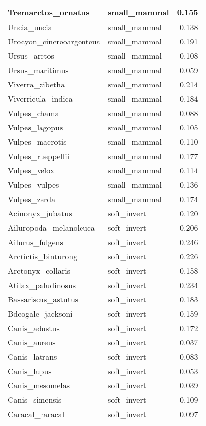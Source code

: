 \begin{table}
\begin{tabular}[t]{l|l|r}
\hline
Tremarctos\_ornatus & small\_mammal & 0.155\\
\hline
Uncia\_uncia & small\_mammal & 0.138\\
\hline
Urocyon\_cinereoargenteus & small\_mammal & 0.191\\
\hline
Ursus\_arctos & small\_mammal & 0.108\\
\hline
Ursus\_maritimus & small\_mammal & 0.059\\
\hline
Viverra\_zibetha & small\_mammal & 0.214\\
\hline
Viverricula\_indica & small\_mammal & 0.184\\
\hline
Vulpes\_chama & small\_mammal & 0.088\\
\hline
Vulpes\_lagopus & small\_mammal & 0.105\\
\hline
Vulpes\_macrotis & small\_mammal & 0.110\\
\hline
Vulpes\_rueppellii & small\_mammal & 0.177\\
\hline
Vulpes\_velox & small\_mammal & 0.114\\
\hline
Vulpes\_vulpes & small\_mammal & 0.136\\
\hline
Vulpes\_zerda & small\_mammal & 0.174\\
\hline
Acinonyx\_jubatus & soft\_invert & 0.120\\
\hline
Ailuropoda\_melanoleuca & soft\_invert & 0.206\\
\hline
Ailurus\_fulgens & soft\_invert & 0.246\\
\hline
Arctictis\_binturong & soft\_invert & 0.226\\
\hline
Arctonyx\_collaris & soft\_invert & 0.158\\
\hline
Atilax\_paludinosus & soft\_invert & 0.234\\
\hline
Bassariscus\_astutus & soft\_invert & 0.183\\
\hline
Bdeogale\_jacksoni & soft\_invert & 0.159\\
\hline
Canis\_adustus & soft\_invert & 0.172\\
\hline
Canis\_aureus & soft\_invert & 0.037\\
\hline
Canis\_latrans & soft\_invert & 0.083\\
\hline
Canis\_lupus & soft\_invert & 0.053\\
\hline
Canis\_mesomelas & soft\_invert & 0.039\\
\hline
Canis\_simensis & soft\_invert & 0.109\\
\hline
Caracal\_caracal & soft\_invert & 0.097\\

\end{tabular}
\end{table}
